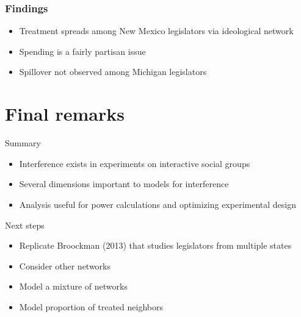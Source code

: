 \documentclass{beamer}
\begin{document}
\begin{frame}
\frametitle{Findings}
  \begin{itemize}
 \item
   {\LARGE Treatment spreads among New Mexico legislators via ideological network}
   \vspace{5mm}
  \item
   {\LARGE Spending is a fairly partisan issue}
   \vspace{5mm}
  \item
   {\LARGE Spillover not observed among Michigan legislators}
  \end{itemize}
\end{frame}


\section{Final remarks}

\begin{frame}{Summary}
  \begin{itemize}
 \item
   {\LARGE Interference exists in experiments on interactive social groups}
   \vspace{5mm}
  \item
   {\LARGE Several dimensions important to models for interference}
   \vspace{5mm}
  \item
   {\LARGE Analysis useful for power calculations and optimizing experimental design}
  \end{itemize}
\end{frame}


\begin{frame}{Next steps}
    \begin{itemize}
	\item {\LARGE Replicate Broockman (2013) that studies legislators from multiple states}
	\vspace{5mm}
	\item {\LARGE Consider other networks}
	\vspace{5mm}
	\item {\LARGE Model a mixture of networks}
	\vspace{5mm}
	\item {\LARGE Model proportion of treated neighbors}
    \end{itemize}
\end{frame}
\end{document}

